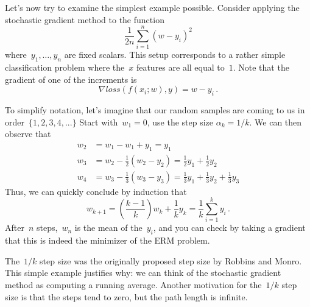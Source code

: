 \documentclass{tufte-book}
\begin{document}
Let's now try to examine the simplest example possible. Consider
applying the stochastic gradient method to the function \[
    \frac{1}{2n} \sum_{i=1}^n  (w-y_i)^2
\] where~\(y_1,\dots,y_n\) are fixed scalars. This setup corresponds to
a rather simple classification problem where the~\(x\) features are all
equal to~\(1\). Note that the gradient of one of the increments is \[
    \nabla \mathit{loss} (f(x_i;w),y) = w-y_i\,.
\]

To simplify notation, let's imagine that our random samples are coming
to us in order~\(\{1,2,3,4,...\}\) Start with~\(w_1=0\), use the step
size \(\alpha_k = 1/k\). We can then observe that \[
\begin{aligned}
w_{2} & =  w_{1}-w_{1}+y_{1}=y_{1}\\
w_{3} & =  w_{2}-\frac{1}{2}\left(w_{2}-y_{2}\right)=\frac{1}{2}y_{1}+\frac{1}{2}y_{2}\\
w_{4} & =   w_{3}-\frac{1}{3}\left(w_{3}-y_{3}\right) = \frac{1}{3}y_{1}+\frac{1}{3}y_{2}+\frac{1}{3}y_{3}
\end{aligned}
\] Thus, we can quickly conclude by induction that \[
w_{k+1} =  \left(\frac{k-1}{k}\right)w_{k}+\frac{1}{k}y_{k}=\frac{1}{k}\sum_{i=1}^{k}y_{i}\,.
\] After~\(n\) steps,~\(w_n\) is the mean of the~\(y_i\), and you can
check by taking a gradient that this is indeed the minimizer of the ERM
problem.

The~\(1/k\) step size was the originally proposed step size by Robbins
and Monro. This simple example justifies why: we can think of the
stochastic gradient method as computing a running average. Another
motivation for the~\(1/k\) step size is that the steps tend to zero, but
the path length is infinite.
\end{document}
